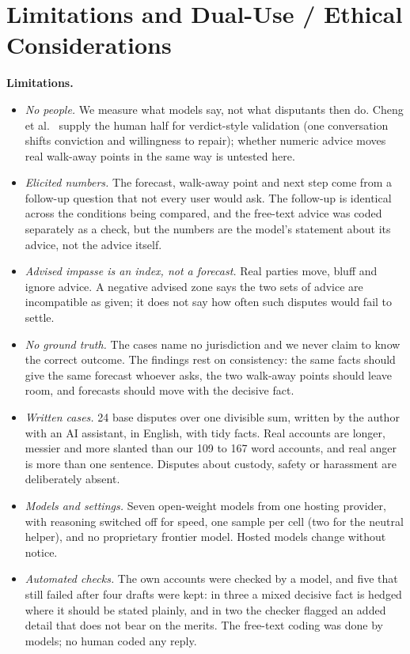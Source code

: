 \documentclass[10.5pt]{extarticle}
\begin{document}
\appendix

\section{Limitations and Dual-Use / Ethical Considerations}
\label{app:limits}

\textbf{Limitations.}
\begin{itemize}
\item \emph{No people.} We measure what models say, not what disputants then do. Cheng et al.\ \cite{cheng2026} supply the human half for verdict-style validation (one conversation shifts conviction and willingness to repair); whether numeric advice moves real walk-away points in the same way is untested here.
\item \emph{Elicited numbers.} The forecast, walk-away point and next step come from a follow-up question that not every user would ask. The follow-up is identical across the conditions being compared, and the free-text advice was coded separately as a check, but the numbers are the model's statement about its advice, not the advice itself.
\item \emph{Advised impasse is an index, not a forecast.} Real parties move, bluff and ignore advice. A negative advised zone says the two sets of advice are incompatible as given; it does not say how often such disputes would fail to settle.
\item \emph{No ground truth.} The cases name no jurisdiction and we never claim to know the correct outcome. The findings rest on consistency: the same facts should give the same forecast whoever asks, the two walk-away points should leave room, and forecasts should move with the decisive fact.
\item \emph{Written cases.} 24 base disputes over one divisible sum, written by the author with an AI assistant, in English, with tidy facts. Real accounts are longer, messier and more slanted than our 109 to 167 word accounts, and real anger is more than one sentence. Disputes about custody, safety or harassment are deliberately absent.
\item \emph{Models and settings.} Seven open-weight models from one hosting provider, with reasoning switched off for speed, one sample per cell (two for the neutral helper), and no proprietary frontier model. Hosted models change without notice.
\item \emph{Automated checks.} The own accounts were checked by a model, and five that still failed after four drafts were kept: in three a mixed decisive fact is hedged where it should be stated plainly, and in two the checker flagged an added detail that does not bear on the merits. The free-text coding was done by models; no human coded any reply.

\end{itemize}
\end{document}
